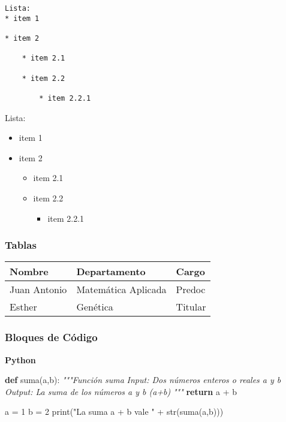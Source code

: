 \documentclass[
  spanish,
]{article}
\newenvironment{Shaded}{}{}
\newcommand{\BuiltInTok}[1]{\textcolor[rgb]{0.00,0.50,0.00}{#1}}
\newcommand{\CommentTok}[1]{\textcolor[rgb]{0.38,0.63,0.69}{\textit{#1}}}
\newcommand{\ControlFlowTok}[1]{\textcolor[rgb]{0.00,0.44,0.13}{\textbf{#1}}}
\newcommand{\DecValTok}[1]{\textcolor[rgb]{0.25,0.63,0.44}{#1}}
\newcommand{\KeywordTok}[1]{\textcolor[rgb]{0.00,0.44,0.13}{\textbf{#1}}}
\newcommand{\NormalTok}[1]{#1}
\newcommand{\OperatorTok}[1]{\textcolor[rgb]{0.40,0.40,0.40}{#1}}
\newcommand{\StringTok}[1]{\textcolor[rgb]{0.25,0.44,0.63}{#1}}
\providecommand{\tightlist}{%
  \setlength{\itemsep}{0pt}\setlength{\parskip}{0pt}}
\begin{document}
\begin{verbatim}
Lista:
* item 1

* item 2

    * item 2.1

    * item 2.2

        * item 2.2.1
\end{verbatim}

Lista:

\begin{itemize}
\item
  item 1
\item
  item 2

  \begin{itemize}
  \item
    item 2.1
  \item
    item 2.2

    \begin{itemize}
    \tightlist
    \item
      item 2.2.1
    \end{itemize}
  \end{itemize}
\end{itemize}

\subsubsection{Tablas}\label{tablas}

\begin{longtable}[]{@{}lll@{}}
\toprule\noalign{}
\textbf{Nombre} & \textbf{Departamento} & \textbf{Cargo} \\
\midrule\noalign{}
\endhead
\bottomrule\noalign{}
\endlastfoot
Juan Antonio & Matemática Aplicada & Predoc \\
Esther & Genética & Titular \\
\end{longtable}

\subsubsection{Bloques de Código}\label{bloques-de-cuxf3digo}

\textbf{Python}

\begin{Shaded}
\begin{Highlighting}[]
\KeywordTok{def}\NormalTok{ suma(a,b):}
    \CommentTok{"""Función suma}
\CommentTok{        Input: Dos números enteros o reales a y b}
\CommentTok{        Output: La suma de los números a y b (a+b)}
\CommentTok{    """}
    \ControlFlowTok{return}\NormalTok{ a }\OperatorTok{+}\NormalTok{ b}

\NormalTok{a }\OperatorTok{=} \DecValTok{1}
\NormalTok{b }\OperatorTok{=} \DecValTok{2}
\BuiltInTok{print}\NormalTok{(}\StringTok{"La suma a + b vale "} \OperatorTok{+} \BuiltInTok{str}\NormalTok{(suma(a,b)))}
\end{Highlighting}
\end{Shaded}
\end{document}
